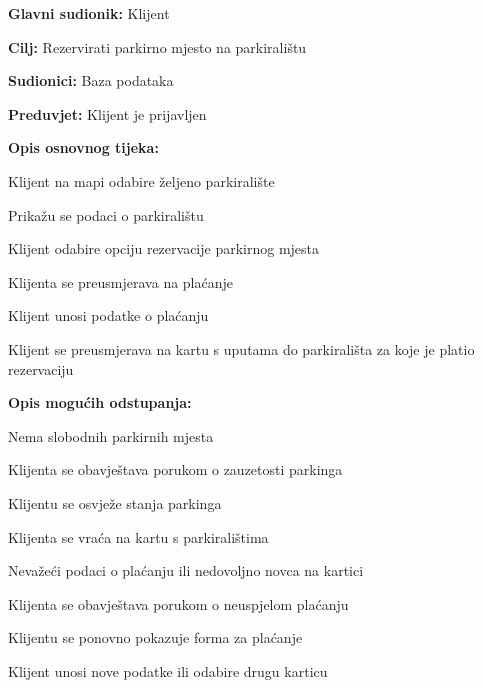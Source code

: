 \noindent {}
\begin{packed_item}
	
	\item \textbf{Glavni sudionik:} Klijent
	\item  \textbf{Cilj:} Rezervirati parkirno mjesto na parkiralištu
	\item  \textbf{Sudionici:} Baza podataka
	\item  \textbf{Preduvjet:} Klijent je prijavljen
	\item  \textbf{Opis osnovnog tijeka:}
	
	\item[] \begin{packed_enum}
		
		\item Klijent na mapi odabire željeno parkiralište
		\item Prikažu se podaci o parkiralištu
		\item Klijent odabire opciju rezervacije parkirnog mjesta
		\item Klijenta se preusmjerava na plaćanje
		\item Klijent unosi podatke o plaćanju
		\item Klijent se preusmjerava na kartu s uputama do parkirališta za koje je platio rezervaciju
		
	\item  \textbf{Opis mogućih odstupanja:}
	
	\item[] \begin{packed_item}
		
		\item[3.a] Nema slobodnih parkirnih mjesta
		\item[] \begin{packed_enum}
			
			\item Klijenta se obavještava porukom o zauzetosti parkinga
			\item Klijentu se osvježe stanja parkinga
			\item Klijenta se vraća na kartu s parkiralištima
			
		\end{packed_enum}
		
		\item[4.a] Nevažeći podaci o plaćanju ili nedovoljno novca na kartici
		\item[] \begin{packed_enum}
			
			\item Klijenta se obavještava porukom o neuspjelom plaćanju
			\item Klijentu se ponovno pokazuje forma za plaćanje
			\item Klijent unosi nove podatke ili odabire drugu karticu
			
		\end{packed_enum}
		
	\end{packed_item}
		
	\end{packed_enum}
\end{packed_item}

